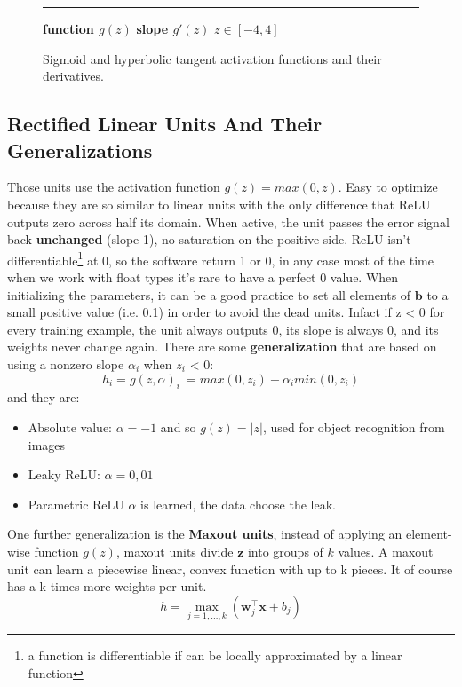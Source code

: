 \begin{figure}[H]
\begin{minipage}{0.48\textwidth}
\end{minipage}

\vspace{0.3cm}
\centering
\small
\textcolor{green!40!black}{\rule{10pt}{2pt}} \textbf{function $g(z)$} \quad 
{} \textbf{slope $g'(z)$} \quad $z \in [-4, 4]$
\caption{Sigmoid and hyperbolic tangent activation functions and their derivatives.}
\label{fig:comp_models}
\end{figure}

\subsection{Rectified Linear Units And Their Generalizations}
Those units use the activation function $g(z) = max(0, z)$. Easy to optimize because they
are so similar to linear units with the only difference that ReLU outputs zero across half
its domain. When active, the unit passes the error signal back \textbf{unchanged} (slope 1), 
no saturation on the positive side. 
\newline
ReLU isn't differentiable\footnote{a function is differentiable if can be locally 
approximated by a linear function} at 0, so the software return 1 or 0, in any case 
most of the time when we work with float types it's rare to have a perfect 0 value. 
\newline
When initializing the parameters, it can be a good practice to set all elements of 
$\mathbf{b}$ to a small positive value (i.e. 0.1) in order to avoid the dead units. 
Infact if z < 0 for every training example, the unit always outputs 0, its slope 
is always 0, and its weights never change again.
There are some \textbf{generalization} that are based on using a nonzero slope $\alpha_i$
when $z_i$ < 0: 
\begin{equation}
    h_i = g(z, \alpha)_i\ = max(0, z_i) + \alpha_imin(0, z_i)   
\end{equation}
and they are:
\begin{itemize}
    \item Absolute value: $\alpha = -1$ and so $g(z) = |z|$, used for object recognition from images
    \item Leaky ReLU: $\alpha = 0,01$
    \item Parametric ReLU $\alpha$ is learned, the data choose the leak.
\end{itemize}
One further generalization is the \textbf{Maxout units}, instead of applying an element-wise
function $g(z)$, maxout units divide $\mathbf{z}$ into groups of $k$ values. A maxout unit
can learn a piecewise linear, convex function with up to k pieces. It of course has a k
times more weights per unit.
\begin{equation}
    h = \max_{j=1,\dots,k} \left( \boldsymbol{w}_j^\top \boldsymbol{x} + b_j \right)
\end{equation}

